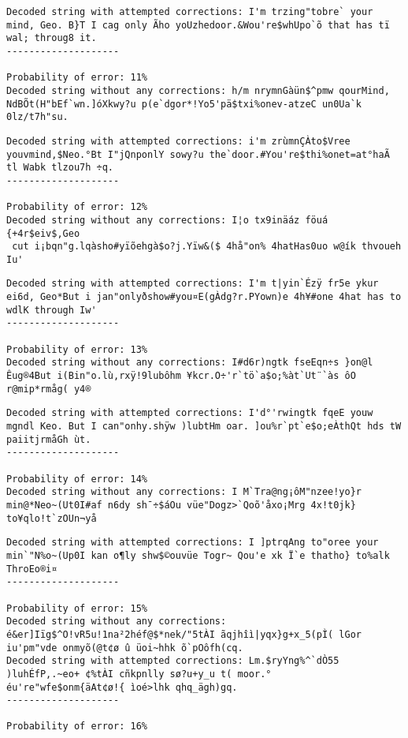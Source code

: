 \documentclass[
  letterpaper,
  DIV=11,
  numbers=noendperiod]{scrartcl}
\begin{document}
\begin{lstlisting}
Decoded string with attempted corrections: I'm trzing"tobre` your mind, Geo. B}T I cag only Ãho yoUzhedoor.&Wou're$whUpo`õ that has tï wal; throug8 it.
--------------------

Probability of error: 11%
Decoded string without any corrections: h/m nrymnGàün$^pmw qourMind, NdBÕt(H"bEf`wn.]óXkwy?u p(e`dgor*!Yo5'pä$txi%onev-atzeC un0Ua`k 0lz/t7h"su.
\end{lstlisting}

\begin{lstlisting}
Decoded string with attempted corrections: i'm zrùmnÇÀto$Vree youvmind,$Neo.°Bt I"jQnponlY sowy?u the`door.#You're$thi%onet=at°haÃ tl Wabk tlzou7h ÷q.
--------------------

Probability of error: 12%
Decoded string without any corrections: I¦o tx9inäáz föuá {+4r$eiv$,Geo
 cut i¡bqn"g.lqàsho#yïõehgà$o?j.Yïw&($ 4hå"on% 4hatHas0uo w@ík thvoueh Iu'
\end{lstlisting}

\begin{lstlisting}
Decoded string with attempted corrections: I'm t|yin`Ézÿ fr5e ykur ei6d, Geo*But i jan"onlyðshow#you¤E(gÀdg?r.PYown)e 4h¥#one 4hat has to wdlK through Iw'
--------------------

Probability of error: 13%
Decoded string without any corrections: I#d6r)ngtk fseEqn÷s }on@l Êug®4But i(Bin"o.lù,rxÿ!9lubôhm ¥kcr.O÷'r`tö`a$o;%àt`Ut¨`às ôO r@mip*rmåg( y4®
\end{lstlisting}

\begin{lstlisting}
Decoded string with attempted corrections: I'd°'rwingtk fqeE youw mgndl Keo. But I can"onhy.shÿw )lubtHm oar. ]ou%r`pt`e$o;eÀthQt hds tW paiitjrmåGh ùt.
--------------------

Probability of error: 14%
Decoded string without any corrections: I M`Tra@ng¡ôM"nzee!yo}r min@*Neo~(Ut0I#af n6dy sh¯÷$áOu vüe"Dogz>`Qoõ'åxo¡Mrg 4x!t0jk} to¥qlo!t`zOUn¬yå 
\end{lstlisting}

\begin{lstlisting}
Decoded string with attempted corrections: I ]ptrqAng to"oree your min`"N%o~(Up0I kan o¶ly shw$©ouvüe Togr~ Qou'e xk Ï`e thatho} to%alk ThroEo®i¤ 
--------------------

Probability of error: 15%
Decoded string without any corrections: é&er]Iïg$^O!vR5u!1na²2héf@$*nek/"5tÀI ãqjhîì|yqx}g+x_5(pÌ( lGor   iu'pm"vde onmyõ(@t¢ø û üoi~hhk õ`pOôfh(cq.
Decoded string with attempted corrections: Lm.$ryYng%^`dÒ55 )luhÉfP,.~eo+ ¢%tÀI cñkpnlly sø?u+y_u t( moor.°    éu're"wfe$onm{äAt¢ø!{ ìoé>lhk qhq_ägh)gq.
--------------------

Probability of error: 16%
\end{lstlisting}
\end{document}
